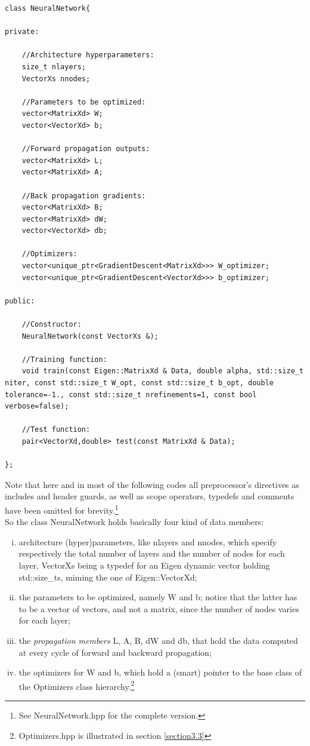 \documentclass[12pt, a4paper]{report}
\theoremstyle{definition}
\begin{document}
\begin{lstlisting}[frame=single, name=neuralnet, showstringspaces=false]
class NeuralNetwork{

private:

	//Architecture hyperparameters:
	size_t nlayers;
	VectorXs nnodes;		

	//Parameters to be optimized:
	vector<MatrixXd> W;	
	vector<VectorXd> b;		

	//Forward propagation outputs:
	vector<MatrixXd> L; 	
	vector<MatrixXd> A;		

	//Back propagation gradients:
	vector<MatrixXd> B;		
	vector<MatrixXd> dW;
	vector<VectorXd> db;

	//Optimizers:
	vector<unique_ptr<GradientDescent<MatrixXd>>> W_optimizer;
	vector<unique_ptr<GradientDescent<VectorXd>>> b_optimizer;

public:

	//Constructor:
	NeuralNetwork(const VectorXs &);
	
	//Training function:
	void train(const Eigen::MatrixXd & Data, double alpha, std::size_t niter, const std::size_t W_opt, const std::size_t b_opt, double tolerance=-1., const std::size_t nrefinements=1, const bool verbose=false);
	
	//Test function:
	pair<VectorXd,double> test(const MatrixXd & Data);
	
};

\end{lstlisting}
\noindent Note that here and in most of the following codes all preprocessor's directives as includes and header guards, as well as scope operators, typedefs and comments have been omitted for brevity.\footnote{See NeuralNetwork.hpp for the complete version.}\\
So the class NeuralNetwork holds basically four kind of data members: 
\begin{enumerate}[(i)]
	\item\label{item:i} architecture (hyper)parameters, like {\ttfamily nlayers} and {\ttfamily nnodes}, which specify respectively the total number of layers and the number of nodes for each layer, {\ttfamily VectorXs} being a {\ttfamily typedef} for an Eigen dynamic vector holding {\ttfamily std::size\_t}s, miming the one of {\ttfamily Eigen::VectorXd};
	\item\label{item:ii} the parameters to be optimized, namely {\ttfamily W} and {\ttfamily b}; notice that the latter has to be a vector of vectors, and not a matrix, since the number of nodes varies for each layer;
	\item\label{item:iii} the \textit{propagation members} {\ttfamily L}, {\ttfamily A}, {\ttfamily B}, {\ttfamily dW} and {\ttfamily db}, that hold the data computed at every cycle of forward and backward propagation;
	\item \label{item:iv} the optimizers for {\ttfamily W} and {\ttfamily b}, which hold a (smart) pointer to the base class of the Optimizers class hierarchy.\footnote{Optimizers.hpp is illustrated in section \ref{section3.3}}
\end{enumerate}
\end{document}
